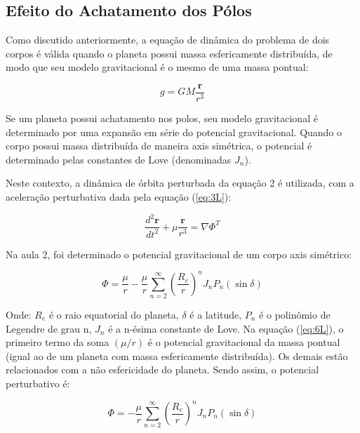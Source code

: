\subsection{Efeito do Achatamento dos Pólos}

\par Como discutido anteriormente, a equação de dinâmica do problema de dois corpos é válida quando o planeta possui massa esfericamente distribuída, de modo que seu modelo gravitacional é o mesmo de uma massa pontual:

\begin{equation}
g = GM \frac{\mathbf{r}}{r^3}
\label{eq:4L}
\end{equation}

\par Se um planeta possui achatamento nos polos, seu modelo gravitacional é determinado por uma expansão em série do potencial gravitacional. Quando o corpo possui massa distribuída de maneira axis simétrica, o potencial é determinado pelas constantes de Love (denominadas $J_n$). 

\par Neste contexto, a dinâmica de órbita perturbada da equação 2 é utilizada, com a aceleração perturbativa dada pela equação (\ref{eq:3L}):

\begin{equation}
\frac{d^2\mathbf{r}}{dt^2} + \mu \frac{\mathbf{r}}{r^3} = \nabla\Phi^T
\label{eq:5L}
\end{equation}

\par Na aula 2, foi determinado o potencial gravitacional de um corpo axis simétrico:

\begin{equation}
\Phi = \frac{\mu}{r} - \frac{\mu}{r} \sum_{n=2}^{\infty} \left(\frac{R_e}{r}\right)^n J_n P_n(\sin\delta)
\label{eq:6L}
\end{equation}

\par Onde: $R_e$ é o raio equatorial do planeta, $\delta$ é a latitude, $P_n$ é o polinômio de Legendre de grau n, $J_n$ é a n-ésima constante de Love. Na equação (\ref{eq:6L}), o primeiro termo da soma $(\mu/r)$ é o potencial gravitacional da massa pontual (igual ao de um planeta com massa esfericamente distribuída). Os demais estão relacionados com a não esfericidade do planeta. Sendo assim, o potencial perturbativo é:

\begin{equation}
\Phi = -\frac{\mu}{r} \sum_{n=2}^{\infty} \left(\frac{R_e}{r}\right)^n J_n P_n(\sin\delta)
\label{eq:7L}
\end{equation}

